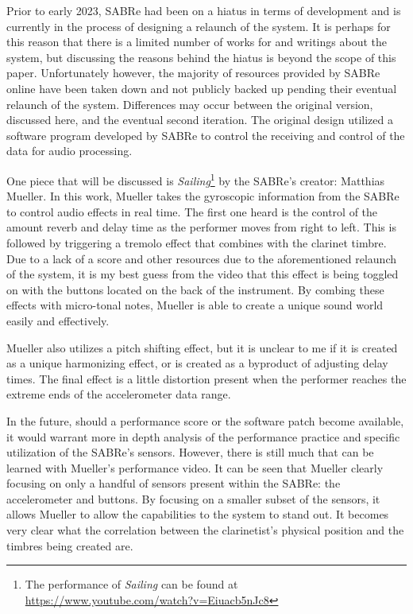 Prior to early 2023, SABRe had been on a hiatus in terms of development and is currently in the process of designing a relaunch of the system. It is perhaps for this reason that there is a limited number of works for and writings about the system, but discussing the reasons behind the hiatus is beyond the scope of this paper. Unfortunately however, the majority of resources provided by SABRe online have been taken down and not publicly backed up pending their eventual relaunch of the system. Differences may occur between the original version, discussed here, and the eventual second iteration. The original design utilized a software program developed by SABRe to control the receiving and control of the data for audio processing. 


One piece that will be discussed is \textit{Sailing}\footnote{The performance of \textit{Sailing} can be found at \url{https://www.youtube.com/watch?v=Eiuacb5nJc8}} by the SABRe's creator: Matthias Mueller. In this work, Mueller takes the gyroscopic information from the SABRe to control audio effects in real time. The first one heard is the control of the amount reverb and delay time as the performer moves from right to left. This is followed by triggering a tremolo effect that combines with the clarinet timbre. Due to a lack of a score and other resources due to the aforementioned relaunch of the system, it is my best guess from the video that this effect is being toggled on with the buttons located on the back of the instrument. By combing these effects with micro-tonal notes, Mueller is able to create a unique sound world easily and effectively.

Mueller also utilizes a pitch shifting effect, but it is unclear to me if it is created as a unique harmonizing effect, or is created as a byproduct of adjusting delay times. The final effect is a little distortion present when the performer reaches the extreme ends of the accelerometer data range.

In the future, should a performance score or the software patch become available, it would warrant more in depth analysis of the performance practice and specific utilization of the SABRe's sensors. However, there is still much that can be learned with Mueller's performance video. It can be seen that Mueller clearly focusing on only a handful of sensors present within the SABRe: the accelerometer and buttons. By focusing on a smaller subset of the sensors, it allows Mueller to allow the capabilities to the system to stand out. It becomes very clear what the correlation between the clarinetist's physical position and the timbres being created are.

